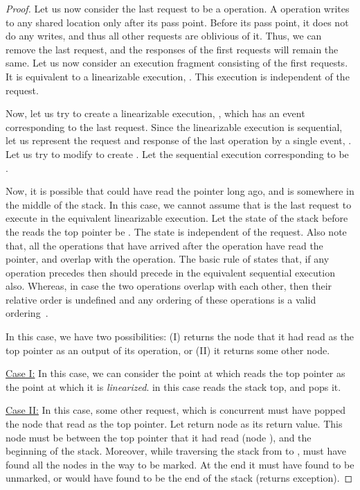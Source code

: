 \documentclass{llncs}
\begin{document}
\begin{proof}
Let us now consider the last request to be a  operation. A  operation writes
to any shared location only after its pass point. Before its pass point, it does not do
any writes, and thus all other requests are oblivious of it. 
Thus, we can remove the last request, and the responses of the first  requests will remain the same.
Let us now consider an execution fragment consisting of the first  requests. It is equivalent to
a linearizable execution, . This execution is independent of the  request. 

Now, let us try to create a linearizable execution, , which has an event corresponding
to the last request. Since the linearizable execution is sequential, let us represent the request
and response of the last  operation by a single event, . 
Let us try to modify  to create . Let the sequential execution corresponding
to  be .

Now, it is possible that  could have read the  pointer long ago, and
is somewhere in the middle of the stack. In this case, we cannot assume that  is the last
request to execute in the equivalent linearizable execution. Let the state of the stack before the 
 reads the top pointer be . The state  is independent of the  request.
Also note that, all the operations that have arrived after the  operation have read the  pointer, and 
overlap with the  operation. The basic rule of  states that, if any operation  
precedes  then  should precede  in the equivalent sequential execution also. Whereas, in case 
the two operations overlap with each other, then their relative order is undefined and any ordering of these 
operations is a valid ordering~\cite{artOfMulti}. 

In this case, we have two possibilities: (I)  returns the node that it had read as the top pointer as an output
of its  operation, or (II) it returns some other node. 

\noindent \underline{Case I:} In this case, we can consider the point at which  reads the top pointer as the point
at which it is {\em linearized}.  in this case reads the stack top, and pops it.

\noindent \underline{Case II:} In this case, some other request, which is concurrent must have popped the node that
 read as the top pointer. Let  return node  as its return value. This node must be between the top pointer
that it had read (node ), and the beginning of the stack. Moreover, while traversing the stack from 
to ,  must have found all the nodes in the way to be marked. At the end it must have found  to be unmarked,
or would have found  to be the end of the stack (returns exception).


\end{proof}
\end{document}
